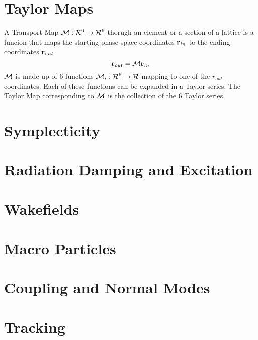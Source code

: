 \section{Taylor Maps}

A Transport Map ${\cal M}: {\cal R}^6 \rightarrow {\cal R}^6$ thorugh
an element or a section of a lattice is a funcion that maps the
starting phase space coordinates ${\bf r}_{in}$ to the ending
coordinates ${\bf r}_{out}$
\begin{equation}
  {\bf r}_{out} = {\cal M} {\bf r}_{in}
\end{equation}
${\cal M}$ is made up of 6 functions ${\cal M}_i: {\cal R}^6
 \rightarrow {\cal R}$ mapping to one of the $r_{out}$
coordinates. Each of these functions can be expanded in a Taylor
series. The Taylor Map corresponding to $\cal M$ is the collection of
the 6 Taylor series.

\section{Symplecticity}

\section{Radiation Damping and Excitation}

\section{Wakefields}

\section{Macro Particles}

\section{Coupling and Normal Modes}

\section{Tracking}

